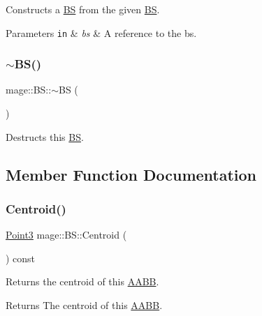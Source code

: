 Constructs a \hyperlink{structmage_1_1_b_s}{BS} from the given \hyperlink{structmage_1_1_b_s}{BS}.


\begin{DoxyParams}[1]{Parameters}
\mbox{\tt in}  & {\em bs} & A reference to the bs. \\
\hline
\end{DoxyParams}
\hypertarget{structmage_1_1_b_s_a111f60f8ab53c7497ff7aaa743619829}{}\label{structmage_1_1_b_s_a111f60f8ab53c7497ff7aaa743619829} 
\subsubsection{\texorpdfstring{$\sim$\+B\+S()}{~BS()}}
{\footnotesize\ttfamily mage\+::\+B\+S\+::$\sim$\+BS (\begin{DoxyParamCaption}{ }\end{DoxyParamCaption})\hspace{0.3cm}{\ttfamily [default]}}

Destructs this \hyperlink{structmage_1_1_b_s}{BS}. 

\subsection{Member Function Documentation}
\hypertarget{structmage_1_1_b_s_a0709a2c2d2a175da0d6e53eda480fce1}{}\label{structmage_1_1_b_s_a0709a2c2d2a175da0d6e53eda480fce1} 
\subsubsection{\texorpdfstring{Centroid()}{Centroid()}}
{\footnotesize\ttfamily \hyperlink{structmage_1_1_point3}{Point3} mage\+::\+B\+S\+::\+Centroid (\begin{DoxyParamCaption}{ }\end{DoxyParamCaption}) const}

Returns the centroid of this \hyperlink{structmage_1_1_a_a_b_b}{A\+A\+BB}.

\begin{DoxyReturn}{Returns}
The centroid of this \hyperlink{structmage_1_1_a_a_b_b}{A\+A\+BB}. 
\end{DoxyReturn}
\hypertarget{structmage_1_1_b_s_afa01cd31b15b2decdf5a3c5333e4c260}{}\label{structmage_1_1_b_s_afa01cd31b15b2decdf5a3c5333e4c260} 

